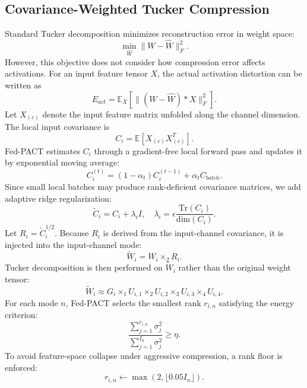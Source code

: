 \documentclass[conference]{IEEEtran}
\begin{document}
\subsection{Covariance-Weighted Tucker Compression}
Standard Tucker decomposition minimizes reconstruction error in weight space:
\begin{equation}
    \min_{\hat{W}}\|W-\hat{W}\|_F^2.
\end{equation}
However, this objective does not consider how compression error affects activations. For an input feature tensor $X$, the actual activation distortion can be written as
\begin{equation}
    E_{act}=
    \mathbb{E}_{X}\left[
        \|(W-\hat{W})*X\|_F^2
        \right].
    \label{eq:actdist}
\end{equation}
Let $X_{(c)}$ denote the input feature matrix unfolded along the channel dimension. The local input covariance is
\begin{equation}
    C_i=\mathbb{E}\left[X_{(c)}X_{(c)}^{T}\right].
\end{equation}
Fed-PACT estimates $C_i$ through a gradient-free local forward pass and updates it by exponential moving average:
\begin{equation}
    C_i^{(t)}=(1-\alpha_t)C_i^{(t-1)}+\alpha_t C_{batch}.
    \label{eq:ema}
\end{equation}
Since small local batches may produce rank-deficient covariance matrices, we add adaptive ridge regularization:
\begin{equation}
    \tilde{C}_i=C_i+\lambda_i I,
    \quad
    \lambda_i=\epsilon\frac{\mathrm{Tr}(C_i)}{\mathrm{dim}(C_i)}.
    \label{eq:ridge}
\end{equation}
Let $R_i=\tilde{C}_i^{1/2}$. Because $R_i$ is derived from the input-channel covariance, it is injected into the input-channel mode:
\begin{equation}
    \tilde{W}_i = W_i \times_2 R_i.
    \label{eq:weightedtensor}
\end{equation}
Tucker decomposition is then performed on $\tilde{W}_i$ rather than the original weight tensor:
\begin{equation}
    \tilde{W}_i \approx
    G_i \times_1 U_{i,1}\times_2 U_{i,2}\times_3 U_{i,3}\times_4 U_{i,4}.
    \label{eq:tucker}
\end{equation}
For each mode $n$, Fed-PACT selects the smallest rank $r_{i,n}$ satisfying the energy criterion:
\begin{equation}
    \frac{\sum_{j=1}^{r_{i,n}}\sigma_{j}^{2}}
    {\sum_{j=1}^{I_n}\sigma_{j}^{2}}
    \geq \eta.
    \label{eq:rank}
\end{equation}
To avoid feature-space collapse under aggressive compression, a rank floor is enforced:
\begin{equation}
    r_{i,n}\leftarrow \max(2,\lfloor 0.05 I_n \rfloor).
    \label{eq:rankfloor}
\end{equation}
\end{document}

